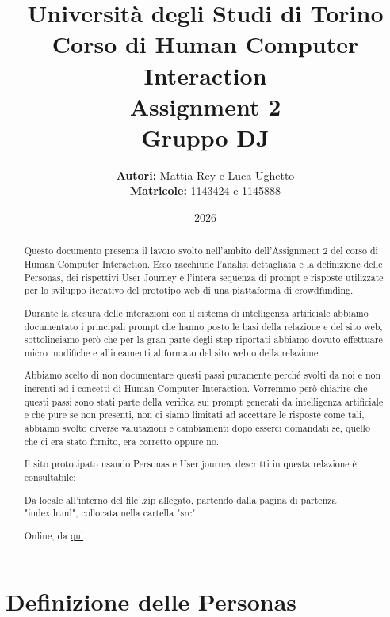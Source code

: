 \documentclass[11pt,a4paper]{article}
\title{
    \normalsize Università degli Studi di Torino \\
    \vspace{0.4cm}
    \Large \textbf{Corso di Human Computer Interaction} \\
    \vspace{0.3cm}
    \huge \textbf{Assignment 2}\\
    \Large \textbf{Gruppo DJ}
}
\author{
    \textbf{Autori:} Mattia Rey e Luca Ughetto \\
    \textbf{Matricole:}  1143424 e 1145888  \\
}
\date{2026}
\begin{document}
    \maketitle
    \thispagestyle{empty}

    \vspace{0.5cm}
    \begin{abstract}

Questo documento presenta il lavoro svolto nell'ambito dell'Assignment 2 del corso di Human Computer Interaction. Esso racchiude l'analisi dettagliata e la definizione delle Personas, dei rispettivi User Journey e l'intera sequenza di prompt e risposte utilizzate per lo sviluppo iterativo del prototipo web di una piattaforma di crowdfunding.

Durante la stesura delle interazioni con il sistema di intelligenza artificiale abbiamo documentato i principali prompt che hanno posto le basi della relazione e del sito web, sottolineiamo però che per la gran parte degli step riportati abbiamo dovuto effettuare micro modifiche e allineamenti al formato del sito web o della relazione. 

Abbiamo scelto di non documentare questi passi puramente perché svolti da noi e non inerenti ad i concetti di Human Computer Interaction. Vorremmo però chiarire che questi passi sono stati parte della verifica sui prompt generati da intelligenza artificiale e che pure se non presenti, non ci siamo limitati ad accettare le risposte come tali, abbiamo svolto diverse valutazioni e cambiamenti dopo esserci domandati se, quello che ci era stato fornito, era corretto oppure no.

Il sito prototipato usando Personas e User journey descritti in questa relazione è consultabile:
	
Da locale all'interno del file .zip allegato, partendo dalla pagina di partenza "index.html", collocata nella cartella "src"
	
Online, da  \href{https://mattiarey.github.io/HCI2026/sito/src/index.html}{qui}.
    \end{abstract}

\newpage

    \tableofcontents

\newpage

    \section{Definizione delle Personas}
    \label{sec:personas}
\end{document}
